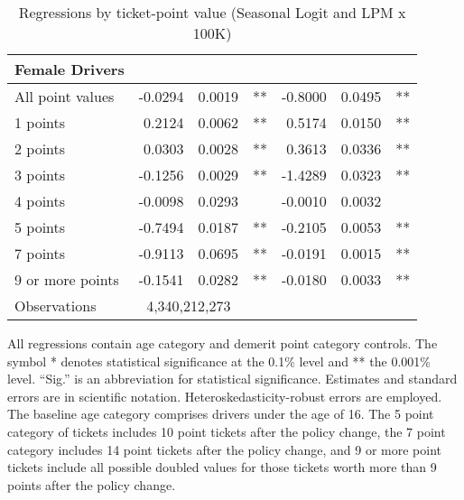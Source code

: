 \begin{table}
\begin{tabular}{l r r l r r l}
\textbf{Female Drivers} \\ 
\hline
All point values                &  -0.0294        &  0.0019       &   **       &  -0.8000        &  0.0495       &   **       \\ 
1 points                        &  0.2124        &  0.0062       &   **       &  0.5174        &  0.0150       &   **       \\ 
2 points                        &  0.0303        &  0.0028       &   **       &  0.3613        &  0.0336       &   **       \\ 
3 points                        &  -0.1256        &  0.0029       &   **       &  -1.4289        &  0.0323       &   **       \\ 
4 points                        &  -0.0098        &  0.0293       &            &  -0.0010        &  0.0032       &            \\ 
5 points                        &  -0.7494        &  0.0187       &   **       &  -0.2105        &  0.0053       &   **       \\ 
7 points                        &  -0.9113        &  0.0695       &   **       &  -0.0191        &  0.0015       &   **       \\ 
9 or more points                &  -0.1541        &  0.0282       &   **       &  -0.0180        &  0.0033       &   **       \\ 
Observations            & \multicolumn{2}{c}{4,340,212,273} \\
         
\hline 

\end{tabular} 
\caption{Regressions by ticket-point value (Seasonal Logit and LPM x 100K)} 
All regressions contain age category and demerit point category controls. 
The symbol * denotes statistical significance at the 0.1\% level 
and ** the 0.001\% level. 
``Sig.'' is an abbreviation for statistical significance. 
Estimates and standard errors are in scientific notation. 
Heteroskedasticity-robust errors are employed. 
The baseline age category comprises drivers under the age of 16. 
The 5 point category of tickets includes 10 point tickets after the policy change,  
the 7 point category includes 14 point tickets after the policy change,  
and 9 or more point tickets include all possible doubled values for those tickets  
worth more than 9 points after the policy change. 
\label{tab:seas_Logit_vs_LPMx100K_regs_by_points} 
\end{table} 
 
